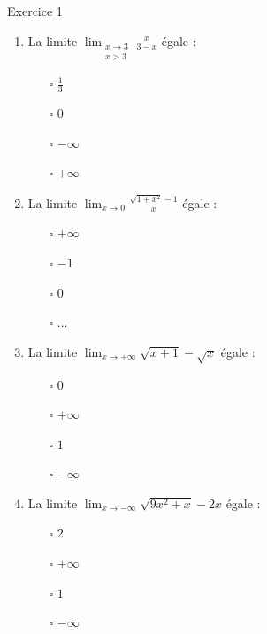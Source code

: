 \documentclass[12pt,a4paper]{article}
\begin{document}
\begin{Exercice}{Exercice 1 }
{\small
\begin{enumerate}
\item La limite $\lim _{\substack{x \rightarrow 3 \\ x>3}} \frac{x}{3-x}$ égale :
\begin{multicols}{4}
\begin{itemize}
\item[$\square$] $\frac{1}{3}$
\item[$\square$] $ 0 $
\item[$\square$]  $-\infty$
\item[$\square$] $+\infty$
\end{itemize}
\end{multicols}
\item La limite $\lim _{x \rightarrow 0} \frac{\sqrt{1+x^2}-1}{x}$ égale :
\begin{multicols}{4}
\begin{itemize}
\item[$\square$] $+\infty$
\item[$\square$] $ -1 $
\item[$\square$]  $ 0 $
\item[$\square$]  $ \dots $
\end{itemize}
\end{multicols}
\item  La limite $\lim _{x \rightarrow+\infty} \sqrt{x+1}-\sqrt{x}$ égale :
\begin{multicols}{4}
\begin{itemize}
\item[$\square$] 0
\item[$\square$] $+\infty$
\item[$\square$] $ 1 $
\item[$\square$] $-\infty$
\end{itemize}
\end{multicols}
\item  La limite $\lim _{x \rightarrow-\infty} \sqrt{9 x^2+x}-2 x$ égale :
\begin{multicols}{4}
\begin{itemize}
\item[$\square$] $ 2 $
\item[$\square$] $+\infty$
\item[$\square$] $ 1 $
\item[$\square$] $-\infty$
\end{itemize}
\end{multicols}

\end{enumerate}}
\end{Exercice}
\end{document}
